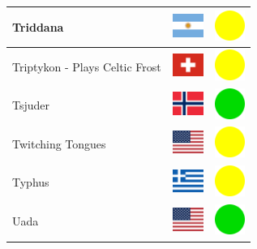 \documentclass[12pt, a4paper, twoside]{report}
\begin{document}
\begin{center}
\begin{longtable}{|p{5cm}|p{2cm}|p{2cm}|}
 Triddana                                                   & \includegraphics[width=1cm]{../img/flags/ar} &   \includegraphics[width=1cm]{../likes/m} \\ \hline
 Triptykon - Plays Celtic Frost                             & \includegraphics[width=1cm]{../img/flags/ch} &   \includegraphics[width=1cm]{../likes/m} \\ \hline
 Tsjuder                                                    & \includegraphics[width=1cm]{../img/flags/no} &   \includegraphics[width=1cm]{../likes/y} \\ \hline
 Twitching Tongues                                          & \includegraphics[width=1cm]{../img/flags/us} &   \includegraphics[width=1cm]{../likes/m} \\ \hline
 Typhus                                                     & \includegraphics[width=1cm]{../img/flags/gr} &   \includegraphics[width=1cm]{../likes/m} \\ \hline
 Uada                                                       & \includegraphics[width=1cm]{../img/flags/us} &   \includegraphics[width=1cm]{../likes/y} \\ \hline

\end{longtable}
\end{center}
\end{document}

